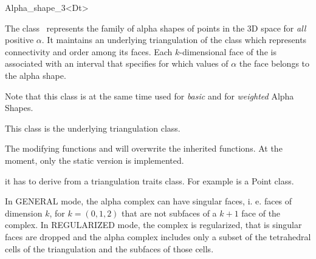 \begin{ccRefClass} {Alpha_shape_3<Dt>}

\ccDefinition

The class \ccClassTemplateName\ represents the family of
alpha shapes of points in the 3D space for {\em all} positive
$\alpha$. It maintains an  underlying triangulation 
of the class  which
represents connectivity and order among its faces. Each
$k$-dimensional face of the  is associated with
an interval that specifies for which values of $\alpha$ the face
belongs to the alpha shape. 

Note that this class is at the same time used for {\em basic} and
for {\em weighted} Alpha Shapes.



\ccInheritsFrom


This class is the underlying triangulation class.

The modifying functions  and  will overwrite
the inherited functions. At the moment, only the static version is implemented.

\ccTypes
{}
\ccThreeToTwo

it has to derive from a triangulation traits class.  
For example  is a Point class. 







{ In GENERAL mode, the alpha complex  can have singular faces,
 i. e. faces of dimension $k$, for $k=(0,1,2)$
that are not subfaces of a $k+1$ face of the complex.
In  REGULARIZED mode, the complex is regularized, that is
singular faces are dropped and the alpha complex 
includes only a subset of the tetrahedral cells 
of the triangulation and the subfaces of those cells.}



\end{ccRefClass}
